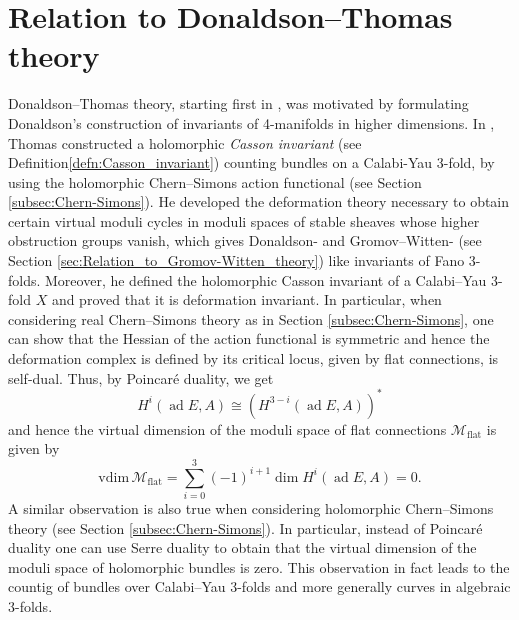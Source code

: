 \documentclass[11pt,colorinlistoftodos]{amsart}
\numberwithin{equation}{subsection}
\theoremstyle{plain}
\theoremstyle{definition}
\theoremstyle{remark}
\DeclareMathOperator{\ad}{ad}
\newcommand{\calM}{\mathcal{M}}
\begin{document}
\section{Relation to Donaldson--Thomas theory}
\label{sec:Relation_to_Donaldson-Thomas_theory}
Donaldson--Thomas theory, starting first in \cite{DonaldsonThomas1998}, was motivated by formulating Donaldson's construction of invariants of 4-manifolds in higher dimensions.  
In \cite{Thomas2000}, Thomas constructed a holomorphic \emph{Casson invariant} (see Definition\ref{defn:Casson_invariant}) counting bundles on a Calabi-Yau 3-fold, by using the holomorphic Chern--Simons action functional (see Section \ref{subsec:Chern-Simons}). He developed the deformation theory necessary to obtain certain virtual moduli cycles in moduli spaces of stable sheaves whose higher obstruction groups vanish, which gives Donaldson- and Gromov--Witten- (see Section \ref{sec:Relation_to_Gromov-Witten_theory}) like invariants of Fano 3-folds. Moreover, he defined the holomorphic Casson invariant of a Calabi--Yau 3-fold $X$ and proved that it is deformation invariant. 
In particular, when considering real Chern--Simons theory as in Section \ref{subsec:Chern-Simons}, one can show that the Hessian of the action functional is symmetric and hence the deformation complex is defined by its critical locus, given by flat connections, is self-dual. Thus, by Poincar\'e duality, we get 
\[
H^i(\ad E, A)\cong (H^{3-i}(\ad E,A))^*
\]
and hence the virtual dimension of the moduli space of flat connections $\calM_\mathrm{flat}$ is given by 
\[
\mathrm{vdim}\,\calM_\mathrm{flat}=\sum_{i=0}^3(-1)^{i+1}\dim H^i(\ad E,A)=0.
\]
A similar observation is also true when considering holomorphic Chern--Simons theory (see Section \ref{subsec:Chern-Simons}). In particular, instead of Poincar\'e duality one can use Serre duality to obtain that the virtual dimension of the moduli space of holomorphic bundles is zero. This observation in fact leads to the countig of bundles over Calabi--Yau 3-folds and more generally curves in algebraic 3-folds.  
\end{document}
